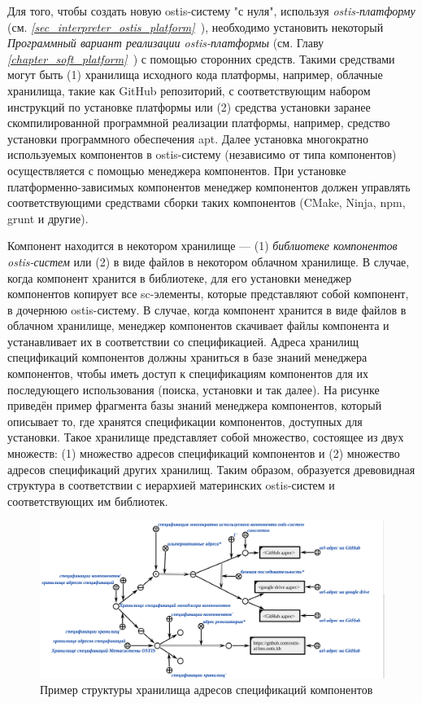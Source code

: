 Для того, чтобы создать новую ostis-систему "с нуля"{}, используя \textit{ostis-платформу} (см. \textit{\ref{sec_interpreter_ostis_platform}~}), необходимо установить некоторый \textit{Программный вариант реализации ostis-платформы} (см. Главу \textit{\ref{chapter_soft_platform}~}) с помощью сторонних средств. Такими средствами могут быть (1) хранилища исходного кода платформы, например, облачные хранилища, такие как GitHub репозиторий, с соответствующим набором инструкций по установке платформы или (2) средства установки заранее скомпилированной программной реализации платформы, например, средство установки программного обеспечения apt. Далее установка многократно используемых компонентов в ostis-систему (независимо от типа компонентов) осуществляется с помощью менеджера компонентов. При установке платформенно-зависимых компонентов менеджер компонентов должен управлять соответствующими средствами сборки таких компонентов (CMake, Ninja, npm, grunt и другие).

Компонент находится в некотором хранилище --- (1) \textit{библиотеке компонентов ostis-систем} или (2) в виде файлов в некотором облачном хранилище. В случае, когда компонент хранится в библиотеке, для его установки менеджер компонентов копирует все sc-элементы, которые представляют собой компонент, в дочернюю ostis-систему. В случае, когда компонент хранится в виде файлов в облачном хранилище, менеджер компонентов скачивает файлы компонента и устанавливает их в соответствии со спецификацией. Адреса хранилищ спецификаций компонентов должны храниться в базе знаний менеджера компонентов, чтобы иметь доступ к спецификациям компонентов для их последующего использования (поиска, установки и так далее). На рисунке \textit{} приведён пример фрагмента базы знаний менеджера компонентов, который описывает то, где хранятся спецификации компонентов, доступных для установки. Такое хранилище представляет собой множество, состоящее из двух множеств: (1) множество адресов спецификаций компонентов и (2) множество адресов спецификаций других хранилищ. Таким образом, образуется древовидная структура в соответствии с иерархией материнских ostis-систем и соответствующих им библиотек.

\begin{figure}[H]
	\includegraphics[scale=0.5]{author/part5/figures/specification_storage_addresses.png}
	\caption{Пример структуры хранилища адресов спецификаций компонентов}
	\label{fig:specification_storage_addresses}
\end{figure}

